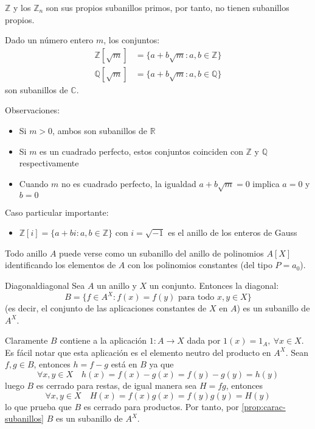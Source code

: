 \begin{remark}
    \(\mathbb{Z}\) y los \(\mathbb{Z}_n\) son sus propios subanillos primos, por tanto, no tienen subanillos propios.
\end{remark}

\begin{example}{}{}
    Dado un número entero \(m\), los conjuntos:
    \begin{align*}
        \mathbb{Z}[\sqrt{m}] &= \{a + b\sqrt{m} : a, b \in \mathbb{Z}\} \\
        \mathbb{Q}[\sqrt{m}] &= \{a + b\sqrt{m} : a, b \in \mathbb{Q}\}
    \end{align*}
    son subanillos de \(\mathbb{C}\).
    
    Observaciones:
    \begin{itemize}
        \item Si \(m > 0\), ambos son subanillos de \(\mathbb{R}\)
        \item Si \(m\) es un cuadrado perfecto, estos conjuntos coinciden con \(\mathbb{Z}\) y \(\mathbb{Q}\) respectivamente
        \item Cuando \(m\) no es cuadrado perfecto, la igualdad \(a + b\sqrt{m} = 0\) implica \(a = 0\) y \(b = 0\)
    \end{itemize}
    
    Caso particular importante:
    \begin{itemize}
        \item \(\mathbb{Z}[i] = \{a + bi : a, b \in \mathbb{Z}\}\) con \(i = \sqrt{-1}\) es el {anillo de los enteros de Gauss}
    \end{itemize}
\end{example}

\begin{example}{}{}
    Todo anillo \(A\) puede verse como un subanillo del anillo de polinomios \(A[X]\) identificando los elementos de \(A\) con los {polinomios constantes} (del tipo \(P = a_0\)).
\end{example}

\begin{example}{Diagonal}{diagonal}
    Sea \(A\) un anillo y \(X\) un conjunto. Entonces la {diagonal}:
    \[
    B = \{f \in A^X : f(x) = f(y) \text{ para todo } x, y \in X\}
    \]
    (es decir, el conjunto de las {aplicaciones constantes} de \(X\) en \(A\)) es un subanillo de \(A^X\).
\end{example}

\begin{proofbox}
    Claramente $B$ contiene a la aplicación $1 : A \to X$ dada por $1(x) = 1_A,\ \forall x \in X$. Es fácil notar que esta aplicación es el elemento neutro del producto en $A^X$. Sean $f,g \in B$, entonces $h = f - g$ está en $B$ ya que
    \[
    \forall x,y \in X \quad h(x)= f(x) - g(x) = f(y) - g(y) = h(y)
    \]
    luego $B$ es cerrado para restas, de igual manera sea $H = fg$, entonces
    \[
    \forall x,y \in X \quad H(x)= f(x)g(x) = f(y)g(y) = H(y)
    \]
    lo que prueba que $B$ es cerrado para productos. Por tanto, por \ref{prop:carac-subanillos} $B$ es un subanillo de $A^X$.
\end{proofbox}

